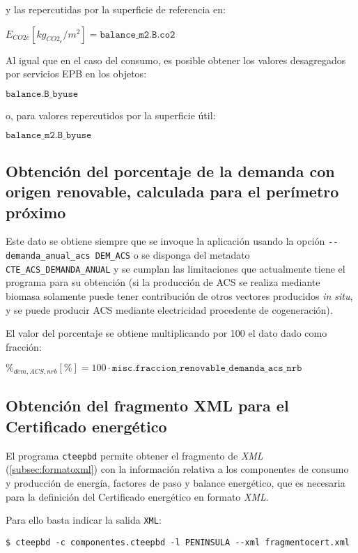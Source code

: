 \documentclass[10pt,notitlepage,oneside,a4paper]{article}
\begin{document}
y las repercutidas por la superficie de referencia en:

$E_{CO2e} [kg_{CO2_e}/m^2] = \texttt{balance\_m2.B.co2}$

Al igual que en el caso del consumo, es posible obtener los valores desagregados por servicios EPB en los objetos:

$\texttt{balance.B\_byuse}$

o, para valores repercutidos por la superficie útil:

$\texttt{balance\_m2.B\_byuse}$

\subsection{Obtención del porcentaje de la demanda con origen renovable, calculada para el perímetro próximo}

Este dato se obtiene siempre que se invoque la aplicación usando la opción \texttt{-{}-demanda\_anual\_acs DEM\_ACS} o se disponga del metadato \texttt{CTE\_ACS\_DEMANDA\_ANUAL} y se cumplan las limitaciones que actualmente tiene el programa para su obtención (si la producción de ACS se realiza mediante biomasa solamente puede tener contribución de otros vectores producidos \textit{in situ}, y se puede producir ACS mediante electricidad procedente de cogeneración).

El valor del porcentaje se obtiene multiplicando por 100 el dato dado como fracción:

$\%_{dem,ACS,nrb} [\%] = 100 \cdot \texttt{misc.fraccion\_renovable\_demanda\_acs\_nrb}$


\subsection{Obtención del fragmento XML para el Certificado energético}

El programa \texttt{cteepbd} permite obtener el fragmento de \textit{XML} (\autoref{subsec:formatoxml}) con la información relativa a los componentes de consumo y producción de energía, factores de paso y balance energético, que es necesaria para la definición del Certificado energético en formato \textit{XML}.

Para ello basta indicar la salida \texttt{XML}:

\begin{Verbatim}[fontsize=\small]
    $ cteepbd -c componentes.cteepbd -l PENINSULA --xml fragmentocert.xml
\end{Verbatim}
\end{document}
